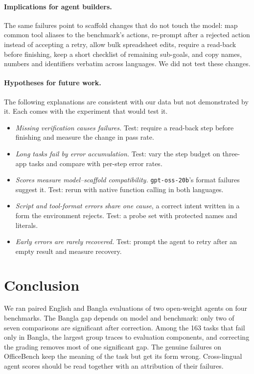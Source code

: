 \documentclass[11pt]{article}
\newcommand{\gptoss}{\texttt{gpt-oss-20b}}
\newcommand{\OB}{OfficeBench}
\begin{document}
\paragraph{Implications for agent builders.} The same failures point to scaffold changes that do
not touch the model: map common tool aliases to the benchmark's actions, re-prompt after a rejected
action instead of accepting a retry, allow bulk spreadsheet edits, require a read-back before
finishing, keep a short checklist of remaining sub-goals, and copy names, numbers and identifiers
verbatim across languages. We did not test these changes.

\paragraph{Hypotheses for future work.} The following explanations are consistent with our data
but not demonstrated by it. Each comes with the experiment that would test it.
\begin{itemize}[noitemsep,topsep=1pt,leftmargin=*]
\item \emph{Missing verification causes failures.} Test: require a read-back step before
finishing and measure the change in pass rate.
\item \emph{Long tasks fail by error accumulation.} Test: vary the step budget on three-app tasks
and compare with per-step error rates.
\item \emph{Scores measure model--scaffold compatibility.} \gptoss{}'s format failures suggest
it. Test: rerun with native function calling in both languages.
\item \emph{Script and tool-format errors share one cause}, a correct intent written in a form the
environment rejects. Test: a probe set with protected names and literals.
\item \emph{Early errors are rarely recovered.} Test: prompt the agent to retry after an empty
result and measure recovery.
\end{itemize}

\section{Conclusion}
We ran paired English and Bangla evaluations of two open-weight agents on four benchmarks. The
Bangla gap depends on model and benchmark: only two of seven comparisons are significant after
correction. Among the 163 tasks that fail only in Bangla, the largest group traces to evaluation
components, and correcting the grading removes most of one significant gap. The genuine failures
on \OB{} keep the meaning of the task but get its form wrong. Cross-lingual agent scores should be
read together with an attribution of their failures.
\end{document}
